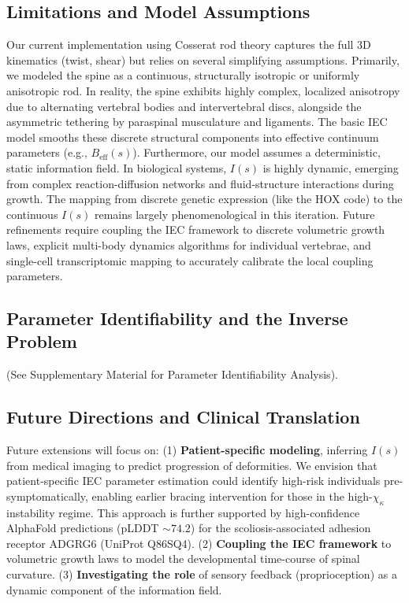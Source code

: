 \documentclass[11pt,a4paper]{article}
\begin{document}
\subsection{Limitations and Model Assumptions}
Our current implementation using Cosserat rod theory captures the full 3D kinematics (twist, shear) but relies on several simplifying assumptions. Primarily, we modeled the spine as a continuous, structurally isotropic or uniformly anisotropic rod. In reality, the spine exhibits highly complex, localized anisotropy due to alternating vertebral bodies and intervertebral discs, alongside the asymmetric tethering by paraspinal musculature and ligaments. The basic IEC model smooths these discrete structural components into effective continuum parameters (e.g., $B_{\mathrm{eff}}(s)$). Furthermore, our model assumes a deterministic, static information field. In biological systems, $I(s)$ is highly dynamic, emerging from complex reaction-diffusion networks and fluid-structure interactions during growth. The mapping from discrete genetic expression (like the HOX code) to the continuous $I(s)$ remains largely phenomenological in this iteration. Future refinements require coupling the IEC framework to discrete volumetric growth laws, explicit multi-body dynamics algorithms for individual vertebrae, and single-cell transcriptomic mapping to accurately calibrate the local coupling parameters.

\subsection{Parameter Identifiability and the Inverse Problem}
(See Supplementary Material for Parameter Identifiability Analysis).

\subsection{Future Directions and Clinical Translation}

Future extensions will focus on: (1) \textbf{Patient-specific modeling}, inferring $I(s)$ from medical imaging to predict progression of deformities. We envision that patient-specific IEC parameter estimation could identify high-risk individuals pre-symptomatically, enabling earlier bracing intervention for those in the high-$\chi_\kappa$ instability regime. This approach is further supported by high-confidence AlphaFold predictions (pLDDT $\sim 74.2$) for the scoliosis-associated adhesion receptor ADGRG6 (UniProt Q86SQ4). (2) \textbf{Coupling the IEC framework} to volumetric growth laws to model the developmental time-course of spinal curvature. (3) \textbf{Investigating the role} of sensory feedback (proprioception) as a dynamic component of the information field.
\end{document}
